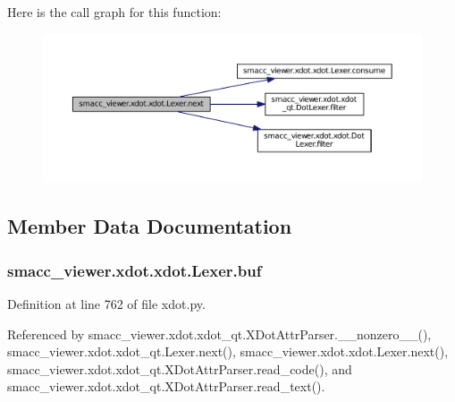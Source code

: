 Here is the call graph for this function\+:
\nopagebreak
\begin{figure}[H]
\begin{center}
\leavevmode
\includegraphics[width=350pt]{classsmacc__viewer_1_1xdot_1_1xdot_1_1Lexer_ac2ef5bd824ca2b7d683c3084f1182c3c_cgraph}
\end{center}
\end{figure}




\subsection{Member Data Documentation}
\subsubsection[{\texorpdfstring{buf}{buf}}]{\setlength{\rightskip}{0pt plus 5cm}smacc\+\_\+viewer.\+xdot.\+xdot.\+Lexer.\+buf}\hypertarget{classsmacc__viewer_1_1xdot_1_1xdot_1_1Lexer_ae6f555ad406cdd55d65f8d35d5f26825}{}\label{classsmacc__viewer_1_1xdot_1_1xdot_1_1Lexer_ae6f555ad406cdd55d65f8d35d5f26825}


Definition at line 762 of file xdot.\+py.



Referenced by smacc\+\_\+viewer.\+xdot.\+xdot\+\_\+qt.\+X\+Dot\+Attr\+Parser.\+\_\+\+\_\+nonzero\+\_\+\+\_\+(), smacc\+\_\+viewer.\+xdot.\+xdot\+\_\+qt.\+Lexer.\+next(), smacc\+\_\+viewer.\+xdot.\+xdot.\+Lexer.\+next(), smacc\+\_\+viewer.\+xdot.\+xdot\+\_\+qt.\+X\+Dot\+Attr\+Parser.\+read\+\_\+code(), and smacc\+\_\+viewer.\+xdot.\+xdot\+\_\+qt.\+X\+Dot\+Attr\+Parser.\+read\+\_\+text().

